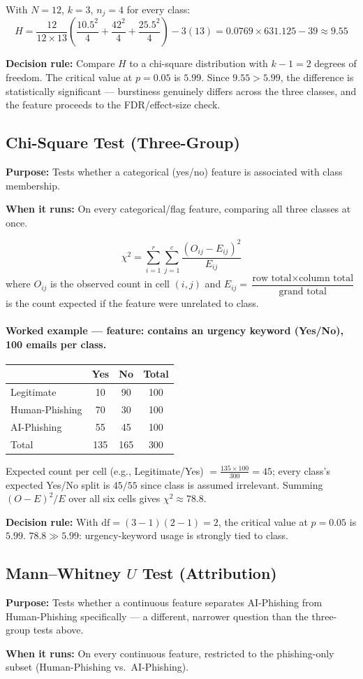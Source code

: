 \documentclass[11pt]{article}
\newcommand{\purpose}[1]{\par\noindent\textbf{Purpose:} #1\par}
\newcommand{\whenrun}[1]{\par\noindent\textbf{When it runs:} #1\par}
\newcommand{\decision}[1]{\par\noindent\textbf{Decision rule:} #1\par}
\begin{document}
With $N=12$, $k=3$, $n_j=4$ for every class:
\[
H = \frac{12}{12 \times 13}\left(\frac{10.5^2}{4}+\frac{42^2}{4}+\frac{25.5^2}{4}\right) - 3(13)
= 0.0769 \times 631.125 - 39 \approx 9.55
\]
\decision{Compare $H$ to a chi-square distribution with $k-1=2$ degrees of freedom. The critical value
at $p=0.05$ is $5.99$. Since $9.55 > 5.99$, the difference is statistically significant --- burstiness
genuinely differs across the three classes, and the feature proceeds to the FDR/effect-size check.}

\subsection{Chi-Square Test (Three-Group)}
\purpose{Tests whether a categorical (yes/no) feature is associated with class membership.}
\whenrun{On every categorical/flag feature, comparing all three classes at once.}

\[
\chi^2 = \sum_{i=1}^{r}\sum_{j=1}^{c} \frac{(O_{ij}-E_{ij})^2}{E_{ij}}
\]
where $O_{ij}$ is the observed count in cell $(i,j)$ and $E_{ij} = \dfrac{\text{row total} \times
\text{column total}}{\text{grand total}}$ is the count expected if the feature were unrelated to class.

\paragraph{Worked example --- feature: contains an urgency keyword (Yes/No), 100 emails per class.}
\begin{center}
\begin{tabular}{lccc}
\toprule
 & Yes & No & Total \\
\midrule
Legitimate & 10 & 90 & 100 \\
Human-Phishing & 70 & 30 & 100 \\
AI-Phishing & 55 & 45 & 100 \\
\midrule
Total & 135 & 165 & 300 \\
\bottomrule
\end{tabular}
\end{center}
Expected count per cell (e.g., Legitimate/Yes) $=\frac{135\times100}{300}=45$; every class's expected
Yes/No split is $45/55$ since class is assumed irrelevant. Summing $(O-E)^2/E$ over all six cells gives
$\chi^2 \approx 78.8$.
\decision{With $\mathrm{df}=(3-1)(2-1)=2$, the critical value at $p=0.05$ is $5.99$. $78.8 \gg 5.99$:
urgency-keyword usage is strongly tied to class.}

\subsection{Mann--Whitney $U$ Test (Attribution)}
\purpose{Tests whether a continuous feature separates AI-Phishing from Human-Phishing specifically ---
a different, narrower question than the three-group tests above.}
\whenrun{On every continuous feature, restricted to the phishing-only subset (Human-Phishing vs.\
AI-Phishing).}
\end{document}
